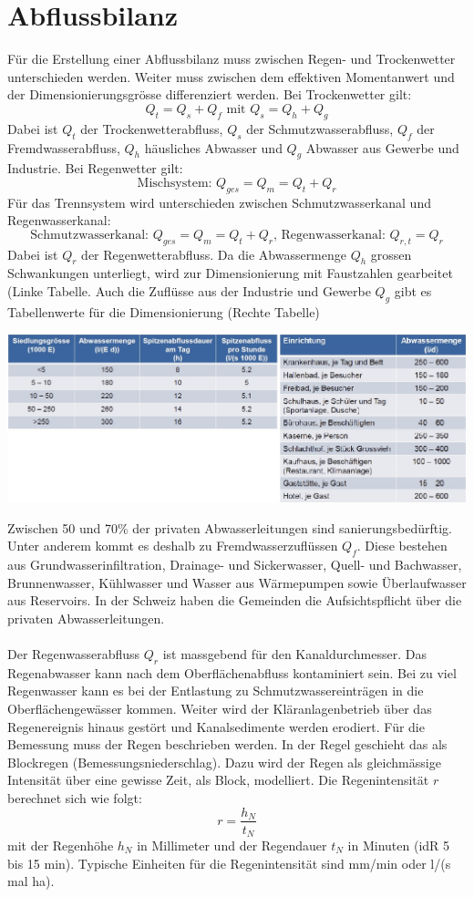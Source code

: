 \documentclass[9pt, openright=false]{scrartcl}
\begin{document}
\section{Abflussbilanz}
Für die Erstellung einer  Abflussbilanz muss zwischen Regen- und Trockenwetter unterschieden werden. Weiter muss zwischen dem effektiven Momentanwert und der Dimensionierungsgrösse differenziert werden. Bei Trockenwetter gilt:\[Q_t = Q_s + Q_f \textrm{    mit   } Q_s = Q_h + Q_g\]
Dabei ist $Q_t$ der Trockenwetterabfluss, $Q_s$ der Schmutzwasserabfluss, $Q_f$ der Fremdwasserabfluss, $Q_h$ häusliches Abwasser und $Q_g$ Abwasser aus Gewerbe und Industrie. Bei Regenwetter gilt:\[\textrm{Mischsystem: }Q_{ges} = Q_m = Q_t + Q_r\] Für das Trennsystem wird unterschieden zwischen Schmutzwasserkanal und Regenwasserkanal:\[\textrm{Schmutzwasserkanal: } Q_{ges} = Q_m = Q_t + Q_r \textrm{, Regenwasserkanal: } Q_{r,t} = Q_r\]
Dabei ist $Q_r$ der Regenwetterabfluss. Da die Abwassermenge $Q_h$ grossen Schwankungen unterliegt, wird zur Dimensionierung mit Faustzahlen gearbeitet (Linke Tabelle. Auch die Zuflüsse aus der Industrie und Gewerbe $Q_g$ gibt es Tabellenwerte für die Dimensionierung (Rechte Tabelle) 
\begin{center}
\includegraphics[width=\textwidth]{images/faustzahlenqh}
\end{center}
Zwischen 50 und 70\% der privaten Abwasserleitungen sind sanierungsbedürftig. Unter anderem kommt es deshalb zu Fremdwasserzuflüssen $Q_f$. Diese bestehen aus Grundwasserinfiltration, Drainage- und Sickerwasser, Quell- und Bachwasser, Brunnenwasser, Kühlwasser und Wasser aus Wärmepumpen sowie Überlaufwasser aus Reservoirs. In der Schweiz haben die Gemeinden die Aufsichtspflicht über die privaten Abwasserleitungen. \\ \\
Der Regenwasserabfluss $Q_r$ ist massgebend für den Kanaldurchmesser. Das Regenabwasser kann nach dem Oberflächenabfluss kontaminiert sein. Bei zu viel Regenwasser kann es bei der Entlastung zu Schmutzwassereinträgen in die Oberflächengewässer kommen. Weiter wird der Kläranlagenbetrieb über das Regenereignis hinaus gestört und Kanalsedimente werden erodiert. Für die Bemessung muss der Regen beschrieben werden. In der Regel geschieht das als Blockregen (Bemessungsniederschlag). Dazu wird der Regen als gleichmässige Intensität über eine gewisse Zeit, als Block, modelliert. Die Regenintensität $r$ berechnet sich wie folgt: \[r = \dfrac{h_N}{t_N}\] mit der Regenhöhe $h_N$ in Millimeter und der Regendauer $t_N$ in Minuten (idR 5 bis 15 min).  Typische Einheiten für die Regenintensität sind mm/min oder l/(s mal ha).
\end{document}

